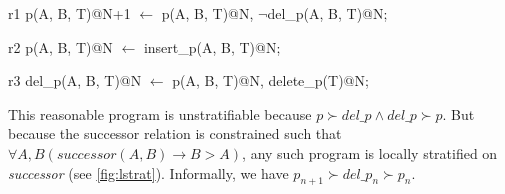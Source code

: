 \begin{Dedalus}
r1
p(A, B, T)@N+1 \(\leftarrow\)
  p(A, B, T)@N,
  \(\lnot\)del\_p(A, B, T)@N;
  
r2
p(A, B, T)@N \(\leftarrow\)
  insert\_p(A, B, T)@N;

r3  
del_p(A, B, T)@N \(\leftarrow\)
  p(A, B, T)@N,
  delete\_p(T)@N;
\end{Dedalus}

This reasonable program is unstratifiable because $p \succ del\_p \land del\_p \succ p$.  But because the successor relation is constrained
such that $\forall A,B (successor(A, B) \rightarrow B > A)$, any such program is locally stratified on \emph{successor} (see \ref{fig:lstrat}).  Informally,
we have $p_{n+1} \succ del\_p_{n} \succ p_{n}$.



